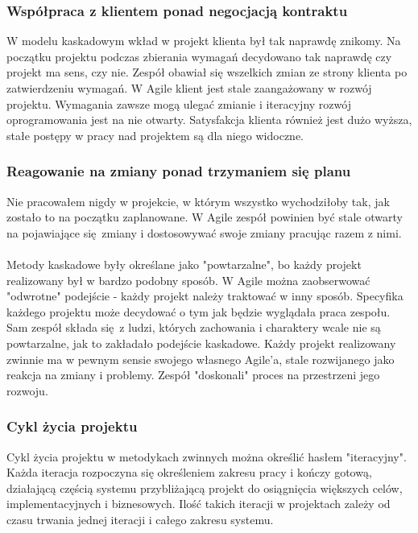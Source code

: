 \documentclass{article}
\begin{document}
\subsubsection*{Współpraca z klientem ponad negocjacją kontraktu}
W modelu kaskadowym wkład w projekt klienta był tak naprawdę znikomy. Na początku projektu podczas zbierania wymagań decydowano tak naprawdę czy projekt ma sens, czy nie. Zespół obawiał się wszelkich zmian ze strony klienta po zatwierdzeniu wymagań. W Agile klient jest stale zaangażowany w rozwój projektu. Wymagania zawsze mogą ulegać zmianie i iteracyjny rozwój oprogramowania jest na nie otwarty. Satysfakcja klienta również jest dużo wyższa, stałe postępy w pracy nad projektem są dla niego widoczne.

\subsubsection*{Reagowanie na zmiany ponad trzymaniem się planu}
Nie pracowałem nigdy w projekcie, w którym wszystko wychodziłoby tak, jak zostało to na początku zaplanowane. W Agile zespół powinien być stale otwarty na pojawiające się zmiany i dostosowywać swoje zmiany pracując razem z nimi.

\paragraph{}
Metody kaskadowe były określane jako "powtarzalne"\cite{scrum}, bo każdy projekt realizowany był w bardzo podobny sposób. W Agile można zaobserwować "odwrotne" podejście - każdy projekt należy traktować w inny sposób. Specyfika każdego projektu może decydować o tym jak będzie wyglądała praca zespołu. Sam zespół składa się z ludzi, których zachowania i charaktery wcale nie są powtarzalne, jak to zakładało podejście kaskadowe. Każdy projekt realizowany zwinnie ma w pewnym sensie swojego własnego Agile'a, stale rozwijanego jako reakcja na zmiany i problemy. Zespół "doskonali" proces na przestrzeni jego rozwoju.

\subsubsection{Cykl życia projektu}
Cykl życia projektu w metodykach zwinnych można określić hasłem "iteracyjny". Każda iteracja rozpoczyna się określeniem zakresu pracy i kończy gotową, działającą częścią systemu przybliżającą projekt do osiągnięcia większych celów, implementacyjnych i biznesowych. Ilość takich iteracji w projektach zależy od czasu trwania jednej iteracji i całego zakresu systemu.
\end{document}
